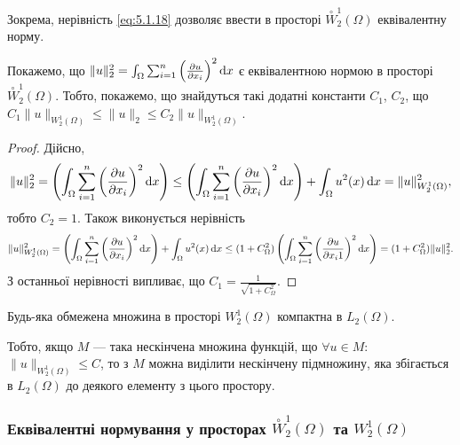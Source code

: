 \begin{remark}
    Зокрема, нерівність \eqref{eq:5.1.18} дозволяє ввести в просторі $\overset{\circ}{W}_2^1(\Omega)$ еквівалентну норму.
\end{remark}

\begin{proposition}
    Покажемо, що $\|u\|_2^2 = \int_\Omega \sum_{i = 1}^n \left( \frac{\partial u}{\partial x_i} \right)^2 \mathop{}\!\mathrm{d} x$ є еквівалентною нормою в просторі $\overset{\circ}{W}_2^1(\Omega)$. Тобто, покажемо, що знайдуться такі додатні константи $C_1$, $C_2$, що $C_1 \|u\|_{W_2^1(\Omega)} \le \|u\|_2 \le C_2 \|u\|_{W_2^1(\Omega)}$.
\end{proposition}

\begin{proof}
    Дійсно,
    \begin{equation*}
        \|u\|_2^2 = \left( \int_\Omega \sum_{i = 1}^n \left( \frac{\partial u}{\partial x_i} \right)^2 \mathop{}\!\mathrm{d} x \right) \le \left( \int_\Omega \sum_{i = 1}^n \left( \frac{\partial u}{\partial x_i} \right)^2 \mathop{}\!\mathrm{d} x \right) + \int_\Omega u^2(x) \mathop{}\!\mathrm{d} x = \|u\|_{W_2^1(\Omega)}^2,
    \end{equation*}
    тобто $C_2 = 1$. Також виконується нерівність
    \begin{equation*}
        \|u\|_{W_2^1(\Omega)}^2 = \left( \int_\Omega \sum_{i = 1}^n \left( \frac{\partial u}{\partial x_i} \right)^2 \mathop{}\!\mathrm{d} x \right) + \int_\Omega u^2(x) \mathop{}\!\mathrm{d} x \le (1 + C_\Omega^2) \left( \int_\Omega \sum_{i = 1}^n \left( \frac{\partial u}{\partial x_i1} \right)^2 \mathop{}\!\mathrm{d} x \right) = (1 + C_\Omega^2) \|u\|_2^2.
    \end{equation*}
    З останньої нерівності випливає, що $C_1 = \frac{1}{\sqrt{1 + C_\Omega^2}}$.
\end{proof}

\begin{theorem}
    Будь-яка обмежена множина в просторі $W_2^1(\Omega)$ компактна в $L_2(\Omega)$.
\end{theorem}

\begin{remark}
    Тобто, якщо $M$ --- така нескінчена множина функцій, що $\forall u \in M$: $\|u\|_{W_2^1(\Omega)} \le C$, то з $M$ можна виділити нескінчену підмножину, яка збігається в $L_2(\Omega)$ до деякого елементу з цього простору. 
\end{remark}

\subsubsection{Еквівалентні нормування у просторах $\overset{\circ}{W}_2^1(\Omega)$ та $W_2^1(\Omega)$}

